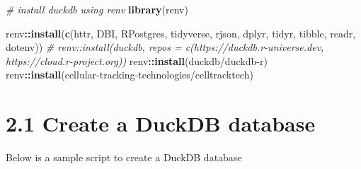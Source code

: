 \documentclass[
]{book}
\newenvironment{Shaded}{\begin{snugshade}}{\end{snugshade}}
\newcommand{\CommentTok}[1]{\textcolor[rgb]{0.56,0.35,0.01}{\textit{#1}}}
\newcommand{\FunctionTok}[1]{\textcolor[rgb]{0.13,0.29,0.53}{\textbf{#1}}}
\newcommand{\NormalTok}[1]{#1}
\newcommand{\SpecialCharTok}[1]{\textcolor[rgb]{0.81,0.36,0.00}{\textbf{#1}}}
\newcommand{\StringTok}[1]{\textcolor[rgb]{0.31,0.60,0.02}{#1}}
\begin{document}
\begin{Shaded}
\begin{Highlighting}[]
\CommentTok{\# install duckdb using renv}
\FunctionTok{library}\NormalTok{(renv)}

\NormalTok{renv}\SpecialCharTok{::}\FunctionTok{install}\NormalTok{(}\FunctionTok{c}\NormalTok{(}\StringTok{\textquotesingle{}httr\textquotesingle{}}\NormalTok{, }\StringTok{\textquotesingle{}DBI\textquotesingle{}}\NormalTok{, }\StringTok{\textquotesingle{}RPostgres\textquotesingle{}}\NormalTok{, }\StringTok{\textquotesingle{}tidyverse\textquotesingle{}}\NormalTok{, }\StringTok{\textquotesingle{}rjson\textquotesingle{}}\NormalTok{, }\StringTok{\textquotesingle{}dplyr\textquotesingle{}}\NormalTok{, }\StringTok{\textquotesingle{}tidyr\textquotesingle{}}\NormalTok{, }\StringTok{\textquotesingle{}tibble\textquotesingle{}}\NormalTok{, }\StringTok{\textquotesingle{}readr\textquotesingle{}}\NormalTok{, }\StringTok{\textquotesingle{}dotenv\textquotesingle{}}\NormalTok{))}
\CommentTok{\# renv::install(\textquotesingle{}duckdb\textquotesingle{}, repos = c(\textquotesingle{}https://duckdb.r{-}universe.dev\textquotesingle{}, \textquotesingle{}https://cloud.r{-}project.org\textquotesingle{}))}
\NormalTok{renv}\SpecialCharTok{::}\FunctionTok{install}\NormalTok{(}\StringTok{\textquotesingle{}duckdb/duckdb{-}r\textquotesingle{}}\NormalTok{)}
\NormalTok{renv}\SpecialCharTok{::}\FunctionTok{install}\NormalTok{(}\StringTok{\textquotesingle{}cellular{-}tracking{-}technologies/celltracktech\textquotesingle{}}\NormalTok{)}
\end{Highlighting}
\end{Shaded}

\section{2.1 Create a DuckDB database}\label{create-a-duckdb-database}

Below is a sample script to create a DuckDB database
\end{document}
